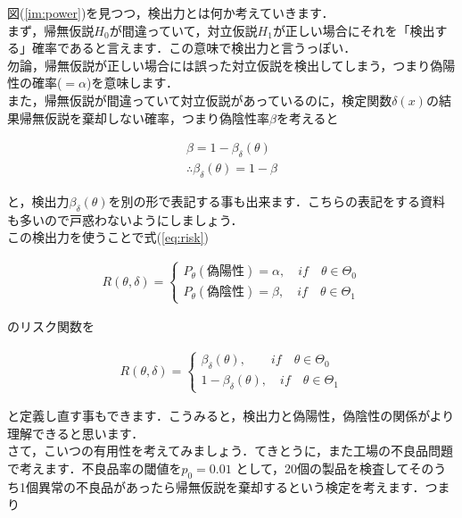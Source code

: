 \documentclass[11pt,a4paper,uplatex]{ujreport} 	%
\begin{document}
図(\ref{im:power})を見つつ，検出力とは何か考えていきます．\\

まず，帰無仮説$H_0$が間違っていて，対立仮説$H_1$が正しい場合にそれを「検出する」確率であると言えます．この意味で検出力と言うっぽい．\\

勿論，帰無仮説が正しい場合には誤った対立仮説を検出してしまう，つまり偽陽性の確率($=\alpha$)を意味します．\\

また，帰無仮説が間違っていて対立仮説があっているのに，検定関数$\delta(x)$の結果帰無仮説を棄却しない確率，つまり偽陰性率$\beta$を考えると

\begin{align}
  \beta = 1- \beta_\delta(\theta)\\
  \therefore \beta_\delta(\theta) = 1- \beta
\end{align}

と，検出力$\beta_\delta(\theta)$を別の形で表記する事も出来ます．こちらの表記をする資料も多いので戸惑わないようにしましょう．\\

この検出力を使うことで式(\ref{eq:risk})

\begin{align}
  R(\theta, \delta) = 
  \left\{
    \begin{array}{l}
    P_\theta(偽陽性)=\alpha, \quad if \quad \theta \in \Theta_0\\
    P_\theta(偽陰性)=\beta, \quad if \quad \theta \in \Theta_1
    \end{array}
  \right.
\end{align}

のリスク関数を

\begin{align}
  R(\theta, \delta) = 
  \left\{
    \begin{array}{l}
    \beta_\delta(\theta), \qquad if \quad \theta \in \Theta_0\\
    1-\beta_\delta(\theta), \quad if \quad \theta \in \Theta_1
    \end{array}
  \right.
  \label{eq:risk2}
\end{align}


と定義し直す事もできます．こうみると，検出力と偽陽性，偽陰性の関係がより理解できると思います．\\


さて，こいつの有用性を考えてみましょう．てきとうに，また工場の不良品問題で考えます．不良品率の閾値を$p_0=0.01$
として，20個の製品を検査してそのうち1個異常の不良品があったら帰無仮説を棄却するという検定を考えます．つまり
\end{document}
